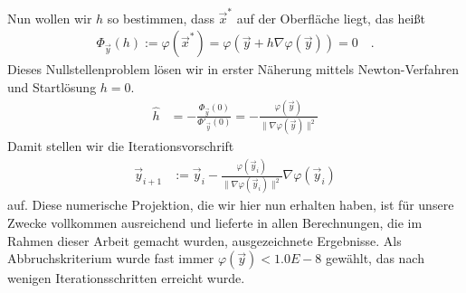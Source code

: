       Nun wollen wir \( h \) so bestimmen, dass \(\vec{x}^{*}\) auf der Oberfläche liegt, das heißt
      \begin{align}
        \Phi_{\vec{y}}(h) := \varphi(\vec{x}^{*}) = \varphi(\vec{y} +  h \nabla\varphi(\vec{y})) = 0 \quad\text{.}
      \end{align}
      Dieses Nullstellenproblem lösen wir in erster Näherung mittels Newton-Verfahren und Startlösung \( h=0 \).
      \begin{align}
        \hat{h} &= - \frac{\Phi_{\vec{y}}(0)}{\Phi'_{\vec{y}}(0)}
                = - \frac{\varphi(\vec{y})}{\|\nabla\varphi(\vec{y})\|^{2}}
      \end{align}
      Damit stellen wir die Iterationsvorschrift
      \begin{align}
        \vec{y}_{i+1} &:= \vec{y}_{i} - \frac{\varphi(\vec{y}_{i})}{\|\nabla\varphi(\vec{y}_{i})\|^{2}}  \nabla\varphi(\vec{y}_{i})
      \end{align}
      auf.
      Diese numerische Projektion, die wir hier nun erhalten haben, ist für unsere Zwecke vollkommen ausreichend und lieferte in allen
      Berechnungen, die im Rahmen dieser Arbeit gemacht wurden, ausgezeichnete Ergebnisse.
      Als Abbruchskriterium wurde fast immer \( \varphi(\vec{y}) < 1.0E-8 \) gewählt, das nach wenigen Iterationsschritten erreicht wurde.


